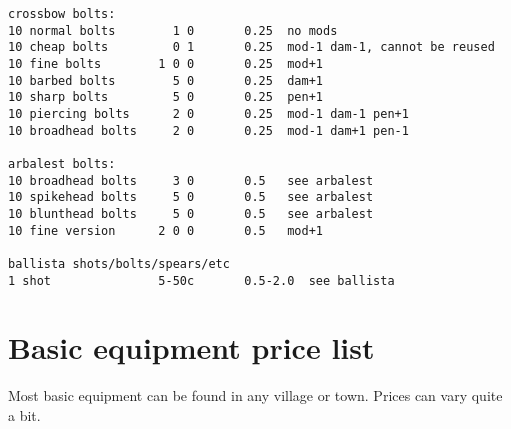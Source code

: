 \begin{verbatim}
crossbow bolts:
10 normal bolts        1 0       0.25  no mods
10 cheap bolts         0 1       0.25  mod-1 dam-1, cannot be reused
10 fine bolts        1 0 0       0.25  mod+1
10 barbed bolts        5 0       0.25  dam+1
10 sharp bolts         5 0       0.25  pen+1
10 piercing bolts      2 0       0.25  mod-1 dam-1 pen+1
10 broadhead bolts     2 0       0.25  mod-1 dam+1 pen-1

arbalest bolts:
10 broadhead bolts     3 0       0.5   see arbalest
10 spikehead bolts     5 0       0.5   see arbalest
10 blunthead bolts     5 0       0.5   see arbalest
10 fine version      2 0 0       0.5   mod+1

ballista shots/bolts/spears/etc
1 shot               5-50c       0.5-2.0  see ballista
\end{verbatim} \normalsize








\section*{Basic equipment price list}
\label{sec:basicequipmentpricelist}

Most basic equipment can be found in any village or town. Prices can vary quite a bit.


